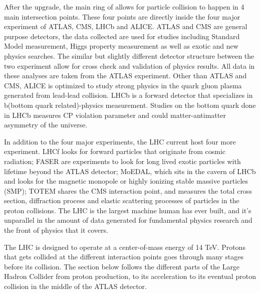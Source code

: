 After the upgrade, the main ring of allows for particle collision to happen in 4 main intersection points. These four points are directly inside the four major experiment of ATLAS, CMS, LHCb and ALICE. ATLAS and CMS are general purpose detectors, the data collected are used for studies including Standard Model measurement, Higgs property measurement as well as exotic and new physics searches. The similar but slightly different detector structure between the two experiment allow for cross check
and validation of physics results. All data in these analyses are taken from the ATLAS experiment. 
Other than ATLAS and CMS, ALICE is optimized to study strong physics in the quark gluon plasma generated from lead-lead collision. LHCb is a forward detector that specializes in b(bottom quark related)-physics measurement. Studies on the bottom quark done in LHCb measures CP violation parameter and could matter-antimatter asymmetry of the universe. 

In addition to the four major experiments, the LHC current host four more experiment. LHCf looks for forward particles that originate from cosmic radiation; FASER are experiments to look for long lived exotic particles with lifetime beyond the ATLAS detector; MoEDAL, which sits in the cavern of LHCb and looks for the magnetic monopole or highly ionizing stable massive particles (SMP); TOTEM shares the CMS interaction point, and measures the total
cross section, diffraction process and elastic scattering processes of particles in the proton collisions. The LHC is the largest machine human has ever built, and it's unparallel in the amount of data generated for fundamental physics research and the front of physics that it covers. 

The LHC is designed to operate at a center-of-mass energy of 14 TeV. Protons that gets collided at the different interaction points goes through many stages before its collision. The section below follows the different parts of the Large Hadron Collider from proton production, to its acceleration to its eventual proton collision in the middle of the ATLAS detector. 

